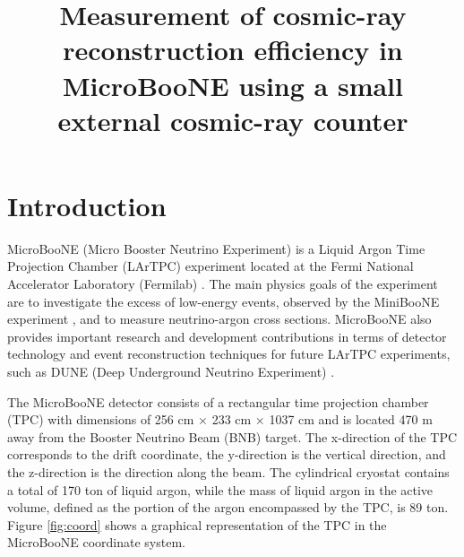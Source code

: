 \documentclass[a4paper,11pt]{article}
\title{\boldmath Measurement of cosmic-ray reconstruction efficiency in MicroBooNE using a small external cosmic-ray counter}
\begin{document}
\maketitle
\flushbottom

\section{Introduction}
\label{sec:intro}
MicroBooNE (Micro Booster Neutrino Experiment) is a Liquid Argon Time Projection Chamber (LArTPC) experiment located at the Fermi National Accelerator Laboratory (Fermilab) \cite{detector}. The main physics goals of the experiment are to investigate the excess of low-energy events, observed by the MiniBooNE experiment \cite{miniboone}, and to measure neutrino-argon cross sections. MicroBooNE also provides important research and development contributions in terms of detector technology and event reconstruction techniques for future LArTPC experiments, such as DUNE (Deep Underground Neutrino Experiment) \cite{dune}.

The MicroBooNE detector  consists of a rectangular time projection chamber (TPC) with dimensions of 256 cm $\times$ 233 cm $\times$ 1037 cm and is located 470 m away from the Booster Neutrino Beam (BNB) target. The x-direction of the TPC corresponds to the drift coordinate, the y-direction is the vertical direction, and the z-direction is the direction along the beam. The cylindrical cryostat contains a total of 170 ton of liquid argon, while the mass of liquid argon in the active volume, defined as the portion of the argon encompassed by the TPC, is 89 ton. Figure \ref{fig:coord} shows a graphical representation of the TPC in the MicroBooNE coordinate system.
\end{document}
